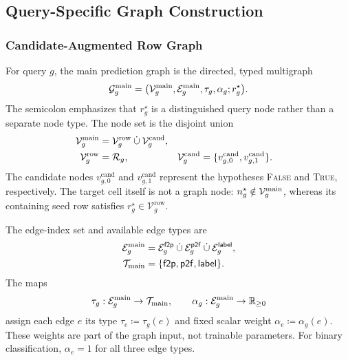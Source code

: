 \subsection{Query-Specific Graph Construction}
\label{sec:method:graph-construction}

\subsubsection{Candidate-Augmented Row Graph}
\label{sec:method:row-graph}

For query \(g\), the main prediction graph is the directed, typed
multigraph
\begin{equation}
  \mathcal G_g^{\mathrm{main}}
  =
  \bigl(
    \mathcal V_g^{\mathrm{main}},
    \mathcal E_g^{\mathrm{main}},
    \tau_g,
    \alpha_g;
    r_g^\star
  \bigr).
\label{eq:method:main-graph}
\end{equation}
The semicolon emphasizes that \(r_g^\star\) is a distinguished query node
rather than a separate node type. The node set is the disjoint union
\begin{equation}
\begin{aligned}
  \mathcal V_g^{\mathrm{main}}
  &=
  \mathcal V_g^{\mathrm{row}}
  \mathbin{\dot\cup}
  \mathcal V_g^{\mathrm{cand}},\\
  \mathcal V_g^{\mathrm{row}}
  &=
  \mathcal R_g,
  &
  \mathcal V_g^{\mathrm{cand}}
  &=
  \{v_{g,0}^{\mathrm{cand}},v_{g,1}^{\mathrm{cand}}\}.
\end{aligned}
\label{eq:method:main-node-set}
\end{equation}
The candidate nodes \(v_{g,0}^{\mathrm{cand}}\) and
\(v_{g,1}^{\mathrm{cand}}\) represent the hypotheses \textsc{False} and
\textsc{True}, respectively. The target cell itself is not a graph node:
\(n_g^\star\notin\mathcal V_g^{\mathrm{main}}\), whereas its containing seed
row satisfies \(r_g^\star\in\mathcal V_g^{\mathrm{row}}\).

The edge-index set and available edge types are
\begin{equation}
\begin{aligned}
  \mathcal E_g^{\mathrm{main}}
  &=
  \mathcal E_g^{\mathsf{f2p}}
  \mathbin{\dot\cup}
  \mathcal E_g^{\mathsf{p2f}}
  \mathbin{\dot\cup}
  \mathcal E_g^{\mathsf{label}},\\
  \mathcal T_{\mathrm{main}}
  &=
  \{\mathsf{f2p},\mathsf{p2f},\mathsf{label}\}.
\end{aligned}
\label{eq:method:main-edge-set}
\end{equation}
The maps
\begin{equation}
  \tau_g:\mathcal E_g^{\mathrm{main}}\to\mathcal T_{\mathrm{main}},
  \qquad
  \alpha_g:\mathcal E_g^{\mathrm{main}}\to\mathbb{R}_{\ge0}
\label{eq:method:main-edge-maps}
\end{equation}
assign each edge \(e\) its type \(\tau_e\coloneqq\tau_g(e)\) and fixed
scalar weight \(\alpha_e\coloneqq\alpha_g(e)\). These weights are part of
the graph input, not trainable parameters. For binary classification,
\(\alpha_e=1\) for all three edge types.

